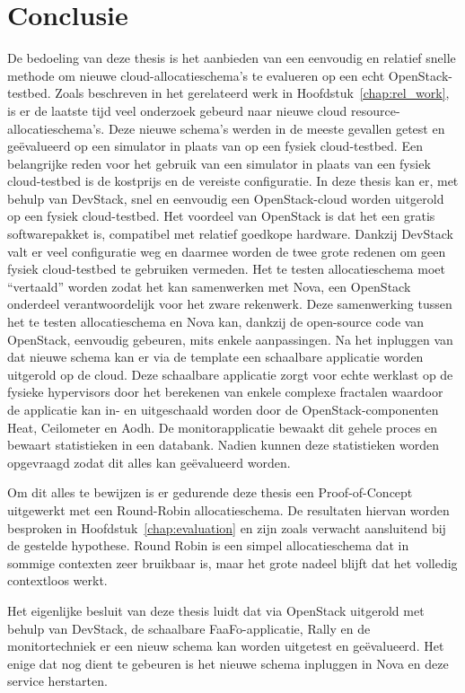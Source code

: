 \chapter{Conclusie}

De bedoeling van deze thesis is het aanbieden van een eenvoudig en relatief snelle methode om nieuwe cloud-allocatieschema's te evalueren op een echt OpenStack-testbed. Zoals beschreven in het gerelateerd werk in Hoofdstuk~\ref{chap:rel_work}, is er de laatste tijd veel onderzoek gebeurd naar nieuwe cloud resource-allocatieschema's. Deze nieuwe schema's werden in de meeste gevallen getest en geëvalueerd op een simulator in plaats van op een fysiek cloud-testbed. Een belangrijke reden voor het gebruik van een simulator in plaats van een fysiek cloud-testbed is de kostprijs en de vereiste configuratie. In deze thesis kan er, met behulp van DevStack, snel en eenvoudig een OpenStack-cloud worden uitgerold op een fysiek cloud-testbed. Het voordeel van OpenStack is dat het een gratis softwarepakket is, compatibel met relatief goedkope hardware. Dankzij DevStack valt er veel configuratie weg en daarmee worden de twee grote redenen om geen fysiek cloud-testbed te gebruiken vermeden. Het te testen allocatieschema moet ``vertaald'' worden zodat het kan samenwerken met Nova, een OpenStack onderdeel verantwoordelijk voor het zware rekenwerk. Deze samenwerking tussen het te testen allocatieschema en Nova kan, dankzij de open-source code van OpenStack, eenvoudig gebeuren, mits enkele aanpassingen. Na het inpluggen van dat nieuwe schema kan er via de template een schaalbare applicatie worden uitgerold op de cloud. Deze schaalbare applicatie zorgt voor echte werklast op de fysieke hypervisors door het berekenen van enkele complexe fractalen waardoor de applicatie kan in- en uitgeschaald worden door de OpenStack-componenten Heat, Ceilometer en Aodh. De monitorapplicatie bewaakt dit gehele proces en bewaart statistieken in een databank. Nadien kunnen deze statistieken worden opgevraagd zodat dit alles kan geëvalueerd worden.

Om dit alles te bewijzen is er gedurende deze thesis een Proof-of-Concept uitgewerkt met een Round-Robin allocatieschema. De resultaten hiervan worden besproken in Hoofdstuk~\ref{chap:evaluation} en zijn zoals verwacht aansluitend bij de gestelde hypothese. Round Robin is een simpel allocatieschema dat in sommige contexten zeer bruikbaar is, maar het grote nadeel blijft dat het volledig contextloos werkt.

Het eigenlijke besluit van deze thesis luidt dat via OpenStack uitgerold met behulp van DevStack, de schaalbare FaaFo-applicatie, Rally en de monitortechniek er een nieuw schema kan worden uitgetest en geëvalueerd. Het enige dat nog dient te gebeuren is het nieuwe schema inpluggen in Nova en deze service herstarten.